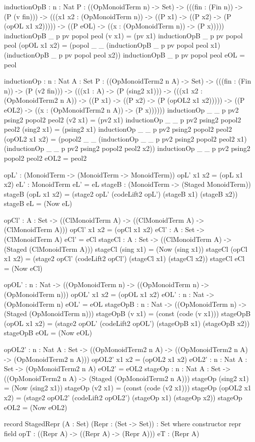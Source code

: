 \begin{togcode}    
  inductionOpB : {n : Nat} {P : ((OpMonoidTerm n) -> Set)} -> 
    (((fin : (Fin n)) -> (P (v fin))) -> 
    (((x1 x2 : (OpMonoidTerm n)) -> 
      ((P x1) -> ((P x2) -> (P (opOL x1 x2))))) -> 
    ((P eOL) -> ((x : (OpMonoidTerm n)) -> (P x)))))
  inductionOpB {_} {p} pv popol peol (v x1) = (pv x1) 
  inductionOpB {_} {p} pv popol peol (opOL x1 x2) = 
    (popol _ _ (inductionOpB {_} {p} pv popol peol x1) 
               (inductionOpB {_} {p} pv popol peol x2)) 
  inductionOpB {_} {p} pv popol peol eOL = peol 

  inductionOp : {n : Nat} {A : Set} {P : ((OpMonoidTerm2 n A) -> Set)} -> 
    (((fin : (Fin n)) -> (P (v2 fin))) -> 
    (((x1 : A) -> (P (sing2 x1))) -> 
    (((x1 x2 : (OpMonoidTerm2 n A)) -> 
      ((P x1) -> ((P x2) -> (P (opOL2 x1 x2))))) -> 
    ((P eOL2) -> ((x : (OpMonoidTerm2 n A)) -> (P x))))))
  inductionOp {_} {_} {p} pv2 psing2 popol2 peol2 (v2 x1) = (pv2 x1) 
  inductionOp {_} {_} {p} pv2 psing2 popol2 peol2 (sing2 x1) = (psing2 x1) 
  inductionOp {_} {_} {p} pv2 psing2 popol2 peol2 (opOL2 x1 x2) = 
    (popol2 _ _ (inductionOp {_} {_} {p} pv2 psing2 popol2 peol2 x1) 
                (inductionOp {_} {_} {p} pv2 psing2 popol2 peol2 x2)) 
  inductionOp {_} {_} {p} pv2 psing2 popol2 peol2 eOL2 = peol2 
\end{togcode}
\begin{togcode} 
  opL' : (MonoidTerm -> (MonoidTerm -> MonoidTerm))
  opL' x1 x2 = (opL x1 x2) 
  eL' : MonoidTerm
  eL'  = eL 
  stageB : (MonoidTerm -> (Staged MonoidTerm))
  stageB (opL x1 x2) = 
    (stage2 opL' (codeLift2 opL') (stageB x1) (stageB x2)) 
  stageB eL = (Now eL) 

  opCl' : {A : Set} -> 
       ((ClMonoidTerm A) -> ((ClMonoidTerm A) -> (ClMonoidTerm A)))
  opCl' x1 x2 = (opCl x1 x2) 
  eCl' : {A : Set} -> (ClMonoidTerm A)
  eCl'  = eCl 
  stageCl : {A : Set} -> ((ClMonoidTerm A) -> (Staged (ClMonoidTerm A)))
  stageCl (sing x1) = (Now (sing x1)) 
  stageCl (opCl x1 x2) = 
    (stage2 opCl' (codeLift2 opCl') (stageCl x1) (stageCl x2)) 
  stageCl eCl = (Now eCl) 
\end{togcode}
\begin{togcode} 
  opOL' : {n : Nat} -> 
       ((OpMonoidTerm n) -> ((OpMonoidTerm n) -> (OpMonoidTerm n)))
  opOL' x1 x2 = (opOL x1 x2) 
  eOL' : {n : Nat} -> (OpMonoidTerm n)
  eOL'  = eOL 
  stageOpB : {n : Nat} -> ((OpMonoidTerm n) -> (Staged (OpMonoidTerm n)))
  stageOpB (v x1) = (const (code (v x1))) 
  stageOpB (opOL x1 x2) = 
    (stage2 opOL' (codeLift2 opOL') (stageOpB x1) (stageOpB x2)) 
  stageOpB eOL = (Now eOL) 

 opOL2' : {n : Nat} {A : Set} -> 
      ((OpMonoidTerm2 n A) -> ((OpMonoidTerm2 n A) -> (OpMonoidTerm2 n A)))
  opOL2' x1 x2 = (opOL2 x1 x2) 
  eOL2' : {n : Nat} {A : Set} -> (OpMonoidTerm2 n A)
  eOL2'  = eOL2 
  stageOp : {n : Nat} {A : Set} -> 
       ((OpMonoidTerm2 n A) -> (Staged (OpMonoidTerm2 n A)))
  stageOp (sing2 x1) = (Now (sing2 x1)) 
  stageOp (v2 x1) = (const (code (v2 x1))) 
  stageOp (opOL2 x1 x2) = 
    (stage2 opOL2' (codeLift2 opOL2') (stageOp x1) (stageOp x2)) 
  stageOp eOL2 = (Now eOL2) 
\end{togcode} 
\begin{togcode} 
  record StagedRepr (A : Set) (Repr : (Set -> Set)) : Set where
    constructor repr
    field
      opT : ((Repr A) -> ((Repr A) -> (Repr A)))
      eT : (Repr A)  
\end{togcode} 
